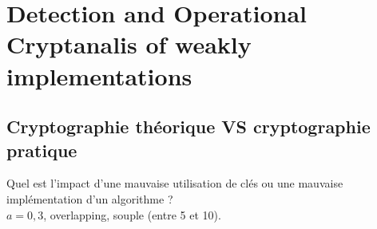 \section{Detection and Operational Cryptanalis of weakly implementations}
\subsection{Cryptographie théorique VS cryptographie pratique}
Quel est l'impact d'une mauvaise utilisation de clés ou une mauvaise implémentation d'un algorithme ?\\
$a=0,3$, overlapping, souple (entre 5 et 10).